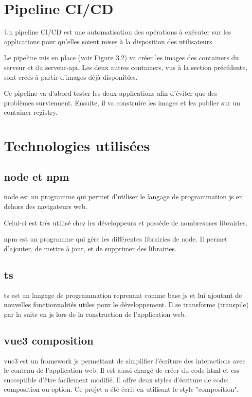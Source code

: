 \documentclass[
    iai, %
    il, %
]{heig-tb}
\begin{document}
\section{Pipeline CI/CD}
Un pipeline CI/CD est une automatisation des opérations à exécuter sur les applications pour qu'elles soient mises à la disposition des utilisateurs.


Le pipeline mis en place (voir Figure 3.2) va créer les images des containers du serveur et du serveur-api.
Les deux autres containers, vus à la section précédente, sont créés à partir d'images déjà disponibles.

Ce pipeline va d'abord tester les deux applications afin d'éviter que des problèmes surviennent.
Ensuite, il va construire les images et les publier sur un container registry.

\section{Technologies utilisées}

\subsection{\gls{node} et \gls{npm}}
\gls{node} est un programme qui permet d'utiliser le langage de programmation \gls{js} en dehors des navigateurs web.

Celui-ci est très utilisé chez les développeurs et possède de nombresuses librairies.

\gls{npm} est un programme qui gère les différentes librairies de \gls{node}.
Il permet d'ajouter, de mettre à jour, et de supprimer des librairies.

\subsection{\gls{ts}}
\gls{ts} est un langage de programmation reprenant comme base \gls{js} et lui ajoutant de nouvelles fonctionnalités utiles pour le développement.
Il se transforme (transpile) par la suite en \gls{js} lors de la construction de l'application web.

\subsection{\gls{vue3} composition}
\gls{vue3} est un framework \gls{js} permettant de simplifier l'écriture des interactions avec le contenu de l'application web.
Il est aussi chargé de créer du code \gls{html} et \gls{css} succeptible d'être facilement modifié.
Il offre deux styles d'écriture de code: composition ou option.
Ce projet a été écrit en utilisant le style "composition".
\end{document}
